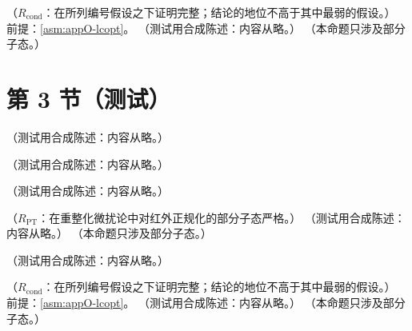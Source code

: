 \begin{lemma}\label{lem:appO-unitarity}
（$R_{\mathrm{cond}}$：在所列编号假设之下证明完整；结论的地位不高于其中最弱的假设。）
前提：\cref{asm:appO-lcopt}。
（测试用合成陈述：内容从略。）
（本命题只涉及部分子态。）
\end{lemma}

\section{第 3 节（测试）}\label{sec:appO-orientation}

\begin{remark}\label{rem:appO-cut-sum-content}
（测试用合成陈述：内容从略。）
\end{remark}

\begin{definition}\label{def:appO-windows}
（测试用合成陈述：内容从略。）
\end{definition}

\begin{lemma}[等光锥时刻插入]\label{lem:appO-equal-time}
（测试用合成陈述：内容从略。）
\end{lemma}

\begin{lemma}\label{lem:appO-insertion-values}
（$R_{\mathrm{PT}}$：在重整化微扰论中对红外正规化的部分子态严格。）
（测试用合成陈述：内容从略。）
（本命题只涉及部分子态。）
\end{lemma}

\begin{remark}[常数 $c$ 与正规化依赖性]\label{rem:appO-constant-c}
（测试用合成陈述：内容从略。）
\end{remark}

\begin{proposition}\label{prop:appO-ss-localize}
（$R_{\mathrm{cond}}$：在所列编号假设之下证明完整；结论的地位不高于其中最弱的假设。）
前提：\cref{asm:appO-lcopt}。
（测试用合成陈述：内容从略。）
（本命题只涉及部分子态。）
\end{proposition}

